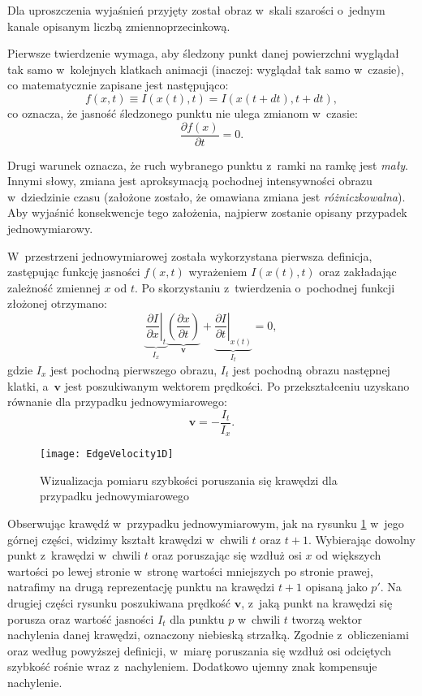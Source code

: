       Dla uproszczenia wyjaśnień przyjęty został obraz w~skali szarości o~jednym kanale opisanym liczbą zmiennoprzecinkową.

      Pierwsze twierdzenie wymaga, aby śledzony punkt danej powierzchni wyglądał tak samo w~kolejnych klatkach animacji (inaczej: wyglądał tak samo w~czasie), co matematycznie zapisane jest następująco: \[ f(x, t) \equiv I(x(t), t) = I(x(t + dt), t + dt), \] co oznacza, że jasność śledzonego punktu nie ulega zmianom w~czasie: \[ \frac{\partial f(x)}{\partial t} = 0. \]

      Drugi warunek oznacza, że ruch wybranego punktu z~ramki na ramkę jest \textit{mały}. Innymi słowy, zmiana jest aproksymacją pochodnej intensywności obrazu w~dziedzinie czasu (założone zostało, że omawiana zmiana jest \textit{różniczkowalna}). Aby wyjaśnić konsekwencje tego założenia, najpierw zostanie opisany przypadek jednowymiarowy.

      W~przestrzeni jednowymiarowej została wykorzystana pierwsza definicja, zastępując funkcję jasności $f(x,t)$ wyrażeniem $I(x(t), t)$ oraz zakładając zależność zmiennej $x$ od $t$. Po skorzystaniu z~twierdzenia o~pochodnej funkcji złożonej otrzymano: \[ \underbrace{ \left. \frac{\partial I}{\partial x}\right|_{t} }_{I_{x}} \underbrace{ \left(\frac{\partial x}{\partial t}\right) }_{\mathbf{v}} + \underbrace{ \left. \frac{\partial I}{\partial t}\right|_{x(t)} }_{I_{t}} = 0, \] gdzie $I_{x}$ jest pochodną pierwszego obrazu, $I_{t}$ jest pochodną obrazu następnej klatki, a~$\mathbf{v}$ jest poszukiwanym wektorem prędkości. Po przekształceniu uzyskano równanie dla przypadku jednowymiarowego: \[ \mathbf{v} = -\frac{I_{t}}{I_{x}}. \]

      \newpage
        \begin{figure}[!ht]
          \centering
          \texttt{[image: EdgeVelocity1D]}
          \caption[Wizualizacja pomiaru szybkości poruszania się krawędzi dla przypadku jednowymiarowego]{Wizualizacja pomiaru szybkości poruszania się krawędzi dla przypadku jednowymiarowego}
          \label{fig:EdgeVelocity1D}
        \end{figure}

      Obserwując krawędź w~przypadku jednowymiarowym, jak na rysunku \ref{fig:EdgeVelocity1D} w~jego górnej części, widzimy kształt krawędzi w~chwili $t$ oraz $t+1$. Wybierając dowolny punkt z~krawędzi w~chwili $t$ oraz poruszając się wzdłuż osi $x$ od większych wartości po lewej stronie w~stronę wartości mniejszych po stronie prawej, natrafimy na drugą reprezentację punktu na krawędzi $t+1$ opisaną jako $p'$. Na drugiej części rysunku poszukiwana prędkość $\mathbf{v}$, z~jaką punkt na krawędzi się porusza oraz wartość jasności $I_{t}$ dla punktu $p$ w~chwili $t$ tworzą wektor nachylenia danej krawędzi, oznaczony niebieską strzałką. Zgodnie z~obliczeniami oraz według powyższej definicji, w~miarę poruszania się wzdłuż osi odciętych szybkość rośnie wraz z~nachyleniem. Dodatkowo ujemny znak kompensuje nachylenie.

